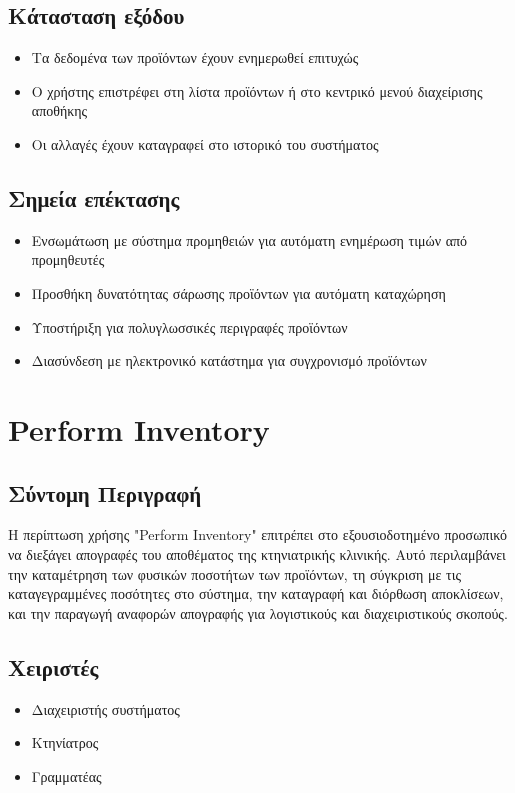 \documentclass[12pt,a4paper,twoside]{book}
\begin{document}
\subsection{Κάτασταση εξόδου} %
\begin{itemize}
  \item Τα δεδομένα των προϊόντων έχουν ενημερωθεί επιτυχώς %
  \item Ο χρήστης επιστρέφει στη λίστα προϊόντων ή στο κεντρικό μενού διαχείρισης αποθήκης %
  \item Οι αλλαγές έχουν καταγραφεί στο ιστορικό του συστήματος
\end{itemize}

\subsection{Σημεία επέκτασης}
\begin{itemize}
  \item Ενσωμάτωση με σύστημα προμηθειών για αυτόματη ενημέρωση τιμών από προμηθευτές
  \item Προσθήκη δυνατότητας σάρωσης προϊόντων για αυτόματη καταχώρηση %
  \item Υποστήριξη για πολυγλωσσικές περιγραφές προϊόντων
  \item Διασύνδεση με ηλεκτρονικό κατάστημα για συγχρονισμό προϊόντων %
\end{itemize}

\section{Perform Inventory}

\subsection{Σύντομη Περιγραφή}
Η περίπτωση χρήσης "Perform Inventory" επιτρέπει στο εξουσιοδοτημένο προσωπικό να διεξάγει απογραφές του αποθέματος της κτηνιατρικής κλινικής. Αυτό περιλαμβάνει την καταμέτρηση των φυσικών ποσοτήτων των προϊόντων, τη σύγκριση με τις καταγεγραμμένες ποσότητες στο σύστημα, την καταγραφή και διόρθωση αποκλίσεων, και την παραγωγή αναφορών απογραφής για λογιστικούς και διαχειριστικούς σκοπούς. %

\subsection{Χειριστές}
\begin{itemize}
  \item Διαχειριστής συστήματος
  \item Κτηνίατρος
  \item Γραμματέας
\end{itemize}
\end{document}
